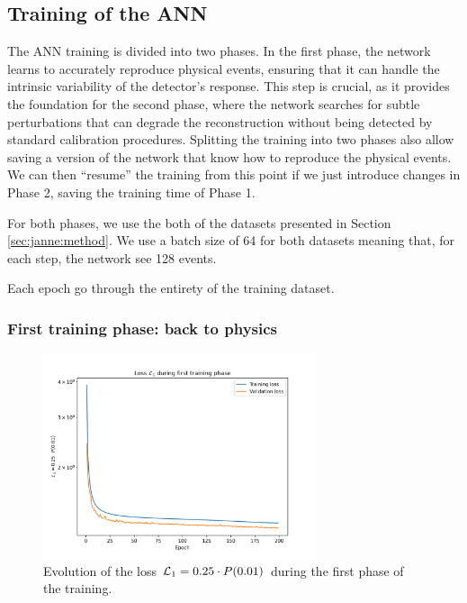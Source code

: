 \documentclass[../main.tex]{subfiles}
\begin{document}
\subsection{Training of the ANN}
\label{sec:janne:arch:training}

The ANN training is divided into two phases. In the first phase, the network learns to accurately reproduce physical events, ensuring that it can handle the intrinsic variability of the detector's response. This step is crucial, as it provides the foundation for the second phase, where the network searches for subtle perturbations that can degrade the reconstruction without being detected by standard calibration procedures. Splitting the training into two phases also allow saving a version of the network that know how to reproduce the physical events. We can then ``resume'' the training from this point if we just introduce changes in Phase 2, saving the training time of Phase 1.

For both phases, we use the both of the datasets presented in Section \ref{sec:janne:method}. We use a batch size of 64 for both datasets meaning that, for each step, the network see 128 events.

Each epoch go through the entirety of the training dataset.

\subsubsection{First training phase: back to physics}
\label{sec:janne:results:identity}

\begin{figure}[ht]
  \centering
  \includegraphics[height=6cm]{images/janne/training/phase_1_penal.png}
  \caption{Evolution of the loss ${\cal L}_1 = 0.25 \cdot P(0.01)$ during the first phase of the training.}
  \label{fig:jann:train:phase_1}
\end{figure}
\end{document}
